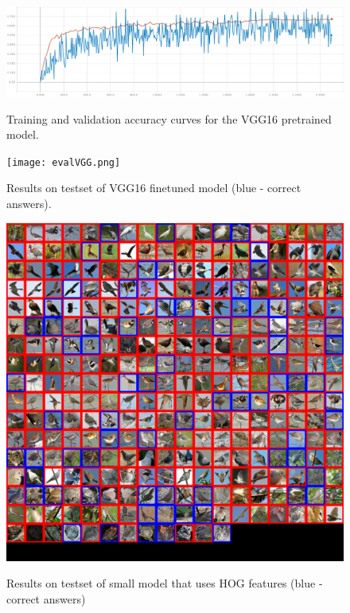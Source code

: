 \documentclass[a4paper]{article}
\begin{document}
\begin{figure}[H]
    \caption[]{Training and validation accuracy curves for the VGG16 pretrained model.}
    \centering
    \includegraphics[page=2,width=1.0\textwidth]{vggTraining_accuracy.png}
    \label{fig:trainingVGG_accuracy}
\end{figure}



\begin{figure}[h]
    \caption[]{Results on testset of VGG16 finetuned model (blue - correct answers).}
    \centering
    \texttt{[image: evalVGG.png]}
    \label{fig:evalVGG}
\end{figure}

\begin{figure}[h]
    \caption[]{Results on testset of small model that uses HOG features (blue - correct answers)}
    \centering
    \includegraphics[page=2,width=1.0\textwidth]{eval.png}
    \label{fig:eval}
\end{figure}
\end{document}
